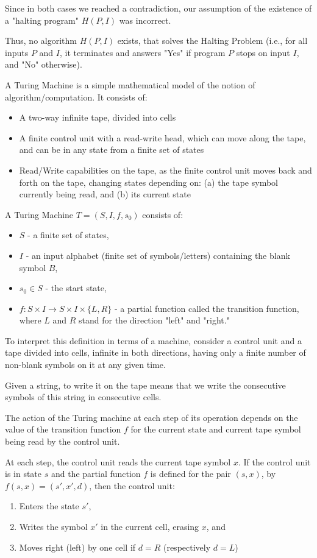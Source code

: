 \documentclass{article}
\begin{document}
Since in both cases we reached a contradiction, our assumption of the existence of a "halting program" $H(P,I)$ was incorrect.

Thus, no algorithm $H(P,I)$ exists, that solves the Halting Problem (i.e., for all inputs $P$ and $I$, it terminates and answers "Yes" if program $P$ stops on input $I$, and "No" otherwise).

A Turing Machine is a simple mathematical model of the notion of algorithm/computation. It consists of:
\begin{itemize}
    \item A two-way infinite tape, divided into cells
    \item A finite control unit with a read-write head, which can move along the tape, and can be in any state from a finite set of states
    \item Read/Write capabilities on the tape, as the finite control unit moves back and forth on the tape, changing states depending on: (a) the tape symbol currently being read, and (b) its current state
\end{itemize}

A Turing Machine $T = (S,I, f, s_0)$ consists of:
\begin{itemize}
    \item $S$ - a finite set of states,
    \item $I$ - an input alphabet (finite set of symbols/letters) containing the blank symbol $B$,
    \item $s_0 \in S$ - the start state,
    \item $f : S \times I \longrightarrow S \times I \times \{L,R\}$ - a partial function called the transition function, where $L$ and $R$ stand for the direction "left" and "right."
\end{itemize}

To interpret this definition in terms of a machine, consider a control unit and a tape divided into cells, infinite in both directions, having only a finite number of non-blank symbols on it at any given time. 

Given a string, to write it on the tape means that we write the consecutive symbols of this string in consecutive cells.

The action of the Turing machine at each step of its operation depends on the value of the transition function $f$ for the current state and current tape symbol being read by the control unit.

At each step, the control unit reads the current tape symbol $x$. If the control unit is in state $s$ and the partial function $f$ is defined for the pair $(s,x)$, by $f(s,x) = (s', x', d)$, then the control unit:
\begin{enumerate}
    \item Enters the state $s'$,
    \item Writes the symbol $x'$ in the current cell, erasing $x$, and
    \item Moves right (left) by one cell if $d = R$ (respectively $d = L$)
\end{enumerate}
\end{document}
